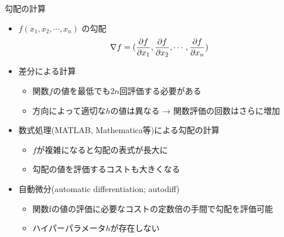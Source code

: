 \begin{frame}[t,fragile]{勾配の計算}
  \begin{itemize}
  \item $f(x_1,x_2,\cdots,x_n)$ の勾配
    \[
      \nabla f = \Large( \frac{\partial f}{\partial x_1}, \frac{\partial f}{\partial x_2}, \cdots, \frac{\partial f}{\partial x_n} \Large)
    \]
  \item 差分による計算
    \begin{itemize}
      \item 関数$f$の値を最低でも$2n$回評価する必要がある
      \item 方向によって適切な$h$の値は異なる → 関数評価の回数はさらに増加
    \end{itemize}
  \item 数式処理(MATLAB, Mathematica等)による勾配の計算
    \begin{itemize}
      \item $f$が複雑になると勾配の表式が長大に
      \item 勾配の値を評価するコストも大きくなる
    \end{itemize}
  \item 自動微分(automatic differentiation; autodiff)
    \begin{itemize}
      \item 関数fの値の評価に必要なコストの定数倍の手間で勾配を評価可能
      \item ハイパーパラメータ$h$が存在しない
    \end{itemize}
  \end{itemize}
\end{frame}
